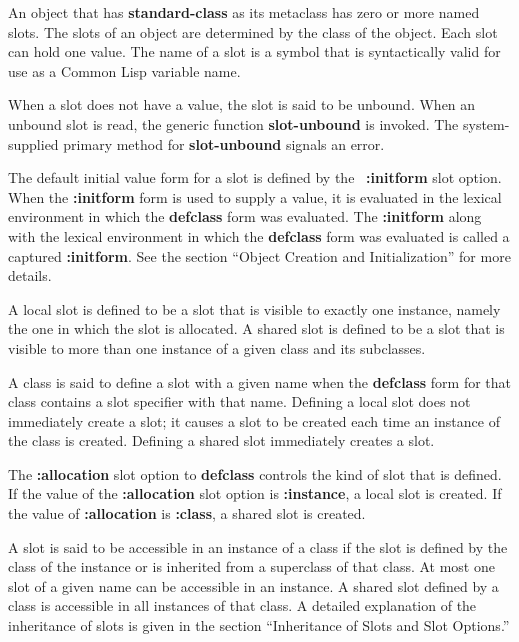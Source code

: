 
An object that has {\bf standard-class} as its metaclass has zero or
more named slots.  The slots of an object are determined by the class
of the object.  Each slot can hold one value.  The name of a slot is a
symbol that is syntactically valid for use as a Common Lisp variable
name.

When a slot does not have a value, the slot is said to be {\bit
unbound}.  When an unbound slot is read, the generic
function {\bf slot-unbound} is invoked. The system-supplied primary method
for {\bf slot-unbound} signals an error.

The default initial value form for a slot is defined by the \hbox{{\bf
:initform}} slot option. When the {\bf :initform} form is used to
supply a value, it is evaluated in the lexical environment in which
the {\bf defclass} form was evaluated. The {\bf :initform} along with
the lexical environment in which the {\bf defclass} form was evaluated
is called a {\bit captured\/} {\bf :initform}. See the section
``Object Creation and Initialization'' for more details.

A {\bit local slot\/} is defined to be a slot that is visible to exactly
one instance, namely the one in which the slot is allocated.  A {\bit
shared slot\/} is defined to be a slot that is visible to more than one
instance of a given class and its subclasses.

A class is said to {\bit define\/} a slot with a given name when
the {\bf defclass} form for that class contains a slot specifier with
that name.  Defining a local slot does not immediately create a slot;
it causes a slot to be created each time an instance of the class is
created.  Defining a shared slot immediately creates a slot.

The {\bf :allocation} slot option to {\bf defclass} controls the kind
of slot that is defined.  If the value of the {\bf :allocation} slot
option is {\bf :instance}, a local slot is created.  If the value of
{\bf :allocation} is {\bf :class}, a shared slot is created.

A slot is said to be {\bit accessible\/} in an instance of a class if
the slot is defined by the class of the instance or is inherited from
a superclass of that class.  At most one slot of a given name can be
accessible in an instance.  A shared slot defined by a class is
accessible in all instances of that class.  A detailed explanation of
the inheritance of slots is given in the section ``Inheritance of
Slots and Slot Options.''

